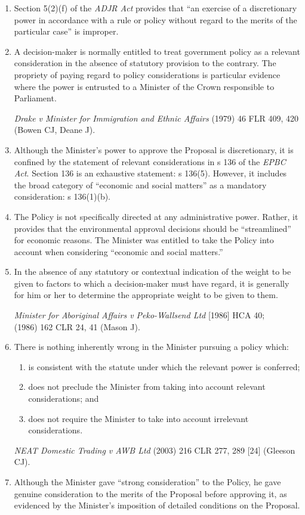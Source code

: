 \documentclass[12pt]{article}
\begin{document}
\begin{enumerate}[1.]
\item
  Section 5(2)(f) of the \emph{ADJR Act} provides that ``an exercise of
  a discretionary power in accordance with a rule or policy without
  regard to the merits of the particular case'' is improper.
\item
  A decision-maker is normally entitled to treat government policy as a
  relevant consideration in the absence of statutory provision to the
  contrary. The propriety of paying regard to policy considerations is
  particular evidence where the power is entrusted to a Minister of the
  Crown responsible to Parliament.

  \emph{Drake v Minister for Immigration and Ethnic Affairs} (1979) 46
  FLR 409, 420 \\(Bowen CJ, Deane J).
\item
  Although the Minister's power to approve the Proposal is
  discretionary, it is confined by the statement of relevant
  considerations in s 136 of the \emph{EPBC Act}. Section 136 is an
  exhaustive statement: s 136(5). However, it includes the broad
  category of ``economic and social matters'' as a mandatory
  consideration: s 136(1)(b).
\item
  The Policy is not specifically directed at any administrative power.
  Rather, it provides that the environmental approval decisions should
  be ``streamlined'' for economic reasons. The Minister was entitled to
  take the Policy into account when considering ``economic and social
  matters.''
\item
  In the absence of any statutory or contextual indication of the weight
  to be given to factors to which a decision-maker must have regard, it
  is generally for him or her to determine the appropriate weight to be
  given to them.

  \emph{Minister for Aboriginal Affairs v Peko-Wallsend Ltd} {[}1986{]}
  HCA 40; \\(1986) 162 CLR 24, 41 (Mason J).
\item
  There is nothing inherently wrong in the Minister pursuing a policy
  which:

  \begin{enumerate}
  \item
    is consistent with the statute under which the relevant power is
    conferred;
  \item
    does not preclude the Minister from taking into account relevant
    considerations; and
  \item
    does not require the Minister to take into account irrelevant
    considerations.
  \end{enumerate}

  \emph{NEAT Domestic Trading v AWB Ltd} (2003) 216 CLR 277, 289
  {[}24{]} (Gleeson CJ).
\item
  Although the Minister gave ``strong consideration'' to the Policy, he
  gave genuine consideration to the merits of the Proposal before
  approving it, as evidenced by the Minister's imposition of detailed
  conditions on the Proposal.
\end{enumerate}
\end{document}
